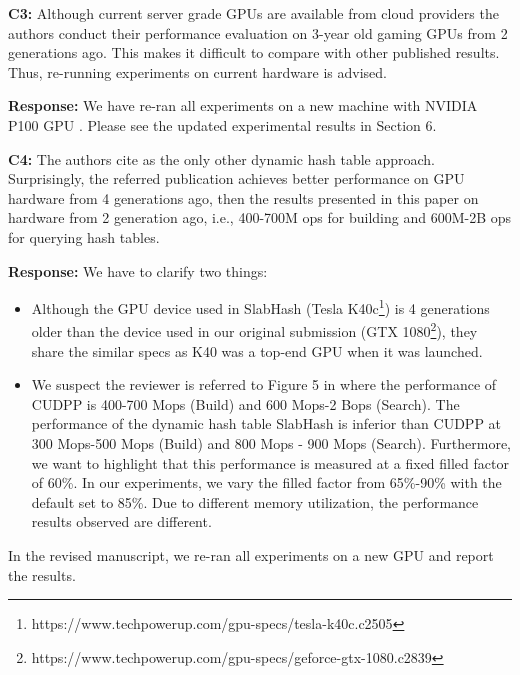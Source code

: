 \begin{shaded}
	\noindent\textbf{C3:} Although current server grade GPUs are available from cloud providers the authors conduct their performance evaluation on 3-year old gaming GPUs from 2 generations ago. This makes it difficult to compare with other published results. Thus, re-running experiments on current hardware is advised.
\end{shaded}
%
\noindent\textbf{Response:} 
We have re-ran all experiments on a new machine with NVIDIA P100 GPU . Please see the updated experimental results in Section 6.

\begin{shaded}
	\noindent\textbf{C4:} The authors cite \cite{ashkiani2018dynamic} as the only other dynamic hash table approach. Surprisingly, the referred publication achieves better performance on GPU hardware from 4 generations ago, then the results presented in this paper on hardware from 2 generation ago, i.e., 400-700M ops for building and 600M-2B ops for querying hash tables.
\end{shaded}
%
\noindent\textbf{Response:} 
We have to clarify two things: 
\begin{itemize}[noitemsep]
	\item Although the GPU device used in SlabHash \cite{ashkiani2018dynamic} (Tesla K40c\footnote{https://www.techpowerup.com/gpu-specs/tesla-k40c.c2505}) is 4 generations older than the device used in our original submission (GTX 1080\footnote{https://www.techpowerup.com/gpu-specs/geforce-gtx-1080.c2839}), they share the similar specs as K40 was a top-end GPU when it was launched. 
	\item We suspect the reviewer is referred to Figure 5 in \cite{ashkiani2018dynamic} where the performance of CUDPP is 400-700 Mops (Build) and 600 Mops-2 Bops (Search). The performance of the dynamic hash table SlabHash is inferior than CUDPP at 300 Mops-500 Mops (Build) and 800 Mops - 900 Mops (Search). Furthermore, we want to highlight that this performance is measured at a fixed filled factor of 60\%. In our experiments, we vary the filled factor from 65\%-90\% with the default set to 85\%. Due to different memory utilization, the performance results observed are different.
\end{itemize}
%
In the revised manuscript, we re-ran all experiments on a new GPU and report the results.

